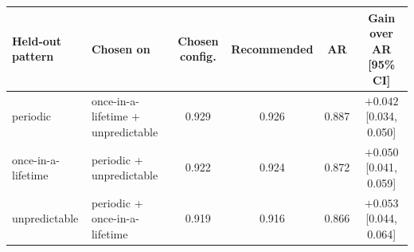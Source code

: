 \begin{tabular}{llcccc}
\toprule
Held-out pattern & Chosen on & Chosen config. & Recommended & AR & Gain over AR [95\% CI] \\
\midrule
periodic & once-in-a-lifetime + unpredictable & 0.929 & 0.926 & 0.887 & $+0.042$ [0.034, 0.050] \\
once-in-a-lifetime & periodic + unpredictable & 0.922 & 0.924 & 0.872 & $+0.050$ [0.041, 0.059] \\
unpredictable & periodic + once-in-a-lifetime & 0.919 & 0.916 & 0.866 & $+0.053$ [0.044, 0.064] \\
\bottomrule
\end{tabular}
